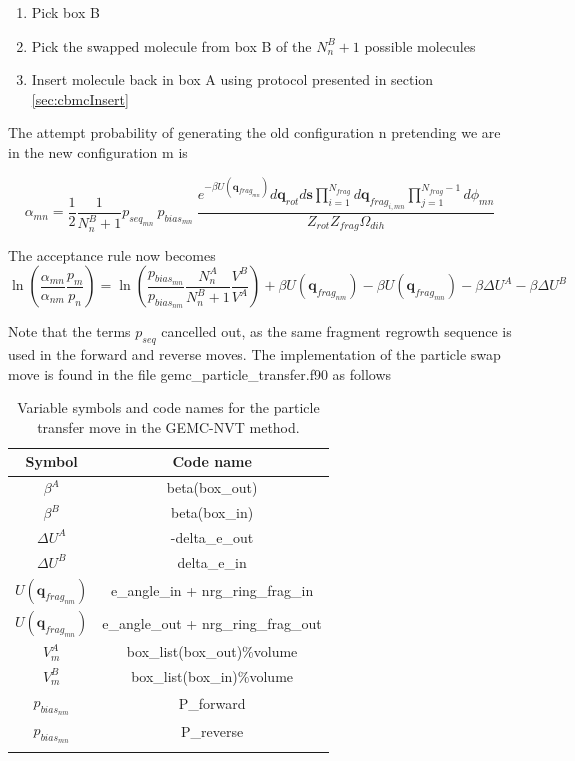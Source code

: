 \begin{enumerate}
\item Pick box B
\item Pick the swapped molecule from box B of the $N^B_n+1$ possible molecules
\item Insert molecule back in box A using protocol presented in section \ref{sec:cbmcInsert}
\end{enumerate}

The attempt probability of generating the old configuration n pretending we are in the new configuration m is

\begin{equation}
\alpha_{mn} = \frac{1}{2} \frac{1}{N^B_n+1} p_{seq_{mn}}\ p_{bias_{mn}}\ \frac{e^{-\beta U(\mathbf{q}_{frag_{mn}})}d\mathbf{q}_{rot}d\mathbf{s}\prod_{i=1}^{N_{frag}}d\mathbf{q}_{frag_{i,mn}}\prod_{j=1}^{N_{frag}-1}d\phi_{mn}}{Z_{rot}Z_{frag}\Omega_{dih}}
\label{eq:gemc_nvt_transfer_reverse}
\end{equation}

The acceptance rule now becomes
\begin{equation}
\ln \left( \frac{\alpha_{mn}}{\alpha_{nm}} \frac{p_m}{p_n} \right) = \ln \left( \frac{ p_{bias_{mn}}}{p_{bias_{nm}}} \frac{N^A_n}{N^B_n+1} \frac{V^B}{V^A} \right) + \beta U(\mathbf{q}_{frag_{nm}})- \beta U(\mathbf{q}_{frag_{mn}}) -\beta \Delta U^A - \beta \Delta U^B
\label{eq:gemc_transfer_final}
\end{equation}

Note that the terms $p_{seq}$ cancelled out, as the same fragment regrowth sequence is used in the forward and reverse moves.
The implementation of the particle swap move is found in the file gemc\_particle\_transfer.f90 as follows

\begin{table}
\caption{Variable symbols and code names for the particle transfer move in the GEMC-NVT method.}
\label{table:gemc_transfer}
\centering
\begin{tabular}{|c|c|} \hline
 {\bf Symbol} & {\bf Code name} \\ \hline
 $\beta^A$ & beta(box\_out) \\
 $\beta^B$ & beta(box\_in) \\
 $\Delta U^A$ & -delta\_e\_out \\
 $\Delta U^B$ & delta\_e\_in \\
 $U(\mathbf{q}_{frag_{nm}})$ & e\_angle\_in + nrg\_ring\_frag\_in \\
 $U(\mathbf{q}_{frag_{mn}})$ & e\_angle\_out + nrg\_ring\_frag\_out \\
 $V^A_m$ & box\_list(box\_out)\%volume \\
 $V^B_m$ & box\_list(box\_in)\%volume \\
 $p_{bias_{nm}}$ & P\_forward \\
 $p_{bias_{mn}}$ & P\_reverse \\
 \hline
\multicolumn{2}{c}{}
\end{tabular}
\end{table}

